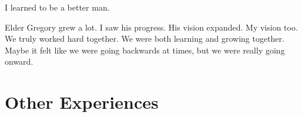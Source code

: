 \begin{entry}
{I learned to be a better man.

Elder Gregory grew a lot.  I saw his progress.  His vision expanded.  My vision too.  We truly worked hard together.  We were both learning and growing together.  Maybe it felt like we were going backwards at times, but we were really going onward.  
}
\end{entry}

\section{Other Experiences}

\begin{entry}
\end{entry}